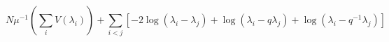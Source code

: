 \begin{equation}
N\mu^{-1} (\sum_i V(\lambda_i)) +\sum_{i<j}[
-2\log(\lambda_i-\lambda_j)+\log(\lambda_i-q\lambda_j)
+\log(\lambda_i-q^{-1}\lambda_j)]
\end{equation}

